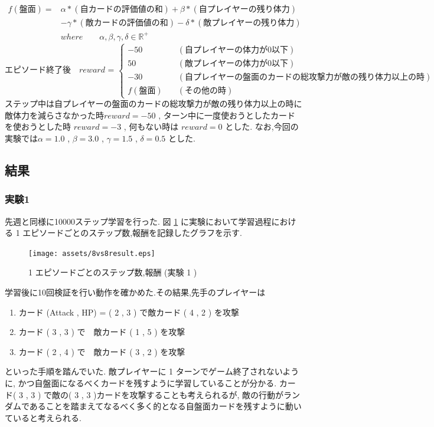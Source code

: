 \documentclass{jarticle}     %
\begin{document}
\begin{equation*}
  \begin{split}
    f(\mathrm{盤面}) = 
    &\alpha*\mathrm{(自カードの評価値の和)}+\beta*\mathrm{(自プレイヤーの残り体力)}\\
   & - \gamma*\mathrm{(敵カードの評価値の和)} - \delta*\mathrm{(敵プレイヤーの残り体力)}\\
    &where \qquad \alpha , \beta , \gamma , \delta \in \mathbb{R}^+
  \end{split}
\end{equation*}
\begin{equation*}
  \mathrm{エピソード終了後}
  \quad reward \text{ = }
  \left\{
    \begin{aligned}
        -50 \quad &(自プレイヤーの体力が0以下) \\
        50 \quad &(敵プレイヤーの体力が0以下) \\
        -30 \quad &(自プレイヤーの盤面のカードの総攻撃力が敵の残り体力以上の時)\\
        f(盤面) \quad &(その他の時)
    \end{aligned}
    \right.
\end{equation*}
ステップ中は自プレイヤーの盤面のカードの総攻撃力が敵の残り体力以上の時に敵体力を減らさなかった時$reward = -50$ , ターン中に一度使おうとしたカードを使おうとした時 $reward = -3$ , 何もない時は $reward = 0$ とした.
なお,今回の実験では$\alpha = 1.0$ , $\beta = 3.0$ , $\gamma = 1.5$ , $\delta = 0.5$ とした.
\subsection{結果}
\subsubsection{実験1}
先週と同様に10000ステップ学習を行った.
図 \ref{fig:8vs8result} に実験において学習過程における 1 エピソードごとのステップ数,報酬を記録したグラフを示す.

\begin{figure}[htbp]
  \centering
  \texttt{[image: assets/8vs8result.eps]}
  \caption{ 1 エピソードごとのステップ数,報酬 (実験 1 )}
  \label{fig:8vs8result}
\end{figure}

学習後に10回検証を行い動作を確かめた.その結果,先手のプレイヤーは
\begin{enumerate}
  \item カード (Attack , HP) = ( 2 , 3 ) で敵カード ( 4 , 2 ) を攻撃
  \item カード ( 3 , 3 ) で　敵カード ( 1 , 5 ) を攻撃
  \item カード ( 2 , 4 ) で　敵カード ( 3 , 2 ) を攻撃
\end{enumerate}
といった手順を踏んでいた.
敵プレイヤーに 1 ターンでゲーム終了されないように, かつ自盤面になるべくカードを残すように学習していることが分かる.
カード( 3 , 3 ) で敵の( 3 , 3 )カードを攻撃することも考えられるが, 敵の行動がランダムであることを踏まえてなるべく多く的となる自盤面カードを残すように動いていると考えられる.
\end{document}
